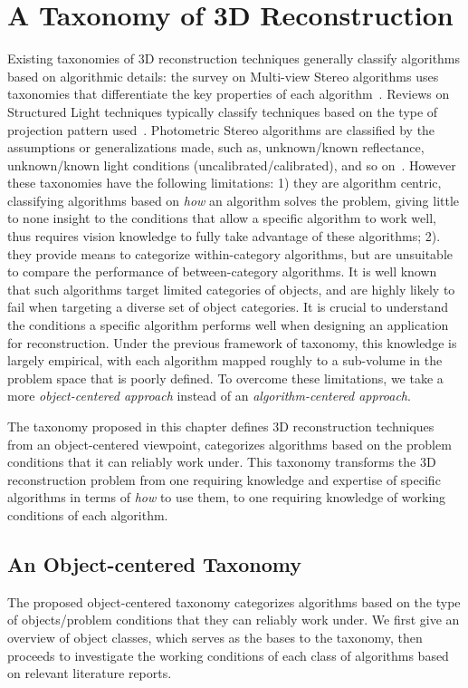 
\chapter{A Taxonomy of 3D Reconstruction}
\label{ch:3DRecon_Taxo}
Existing taxonomies of 3D reconstruction techniques generally classify algorithms based on algorithmic details: the survey on Multi-view Stereo algorithms uses taxonomies that differentiate the key properties of each algorithm~\cite{seitz2006comparison}. Reviews on Structured Light techniques typically classify techniques based on the type of projection pattern used~\cite{geng2011structured, salvi2004pattern}. Photometric Stereo algorithms are classified by the assumptions or generalizations made, such as, unknown/known reflectance, unknown/known light conditions (uncalibrated/calibrated), and so on~\cite{shi2016benchmark}.
However these taxonomies have the following limitations: 1) they are algorithm centric, classifying algorithms based on \textit{how} an algorithm solves the problem, giving little to none insight to the conditions that allow a specific algorithm to work well, thus requires vision knowledge to fully take advantage of these algorithms; 2). they provide means to categorize within-category algorithms, but are unsuitable to compare the performance of between-category algorithms. It is well known that such algorithms target limited categories of objects, and are highly likely to fail when targeting a diverse set of object categories. It is crucial to understand the conditions a specific algorithm performs well when designing an application for reconstruction. Under the previous framework of taxonomy, this knowledge is largely empirical, with each algorithm mapped roughly to a sub-volume in the problem space that is poorly defined. To overcome these limitations, we take a more \textit{object-centered approach} instead of an \textit{algorithm-centered approach}.

The taxonomy proposed in this chapter defines 3D reconstruction techniques from an object-centered viewpoint, \ie categorizes algorithms based on the problem conditions that it can reliably work under. This taxonomy transforms the 3D reconstruction problem from one requiring knowledge and expertise of specific algorithms in terms of \textit{how} to use them, to one requiring knowledge of working conditions of each algorithm.

\section{An Object-centered Taxonomy}
The proposed object-centered taxonomy categorizes algorithms based on the type of objects/problem conditions that they can reliably work under. We first give an overview of object classes, which serves as the bases to the taxonomy, then proceeds to investigate the working conditions of each class of algorithms based on relevant literature reports.

